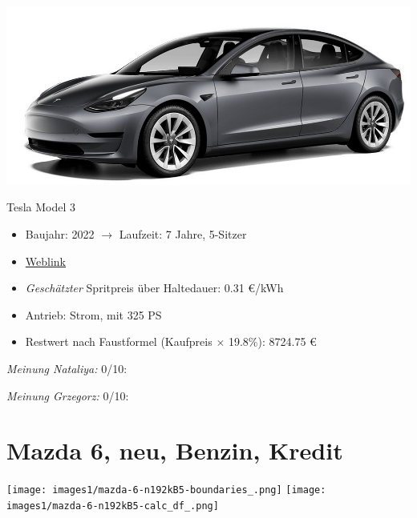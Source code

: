 \documentclass[landscape, DIV=99, 14pt]{scrartcl}
\begin{document}
\pagebreak
\begin{center}
\includegraphics[width=0.9\columnwidth]{cars/tesla-model-3.jpg}

Tesla Model 3
\end{center}

\begin{itemize}
    \item Baujahr: 2022 $\rightarrow$ Laufzeit: 7 Jahre, 5-Sitzer
    \item \href{https://www.tesla.com/de_de/model3/design\#overview}{Weblink}
    \item \emph{Gesch\"atzter} Spritpreis \"uber Haltedauer: 0.31 \euro{}/kWh
    \item Antrieb: Strom, mit 325 PS
    \item Restwert nach Faustformel (Kaufpreis $\times$ 19.8\%): 8724.75 \euro{}
\end{itemize}

\begin{small}
\emph{Meinung Nataliya:} 0/10: 
        
\emph{Meinung Grzegorz:} 0/10: 
\end{small}

\pagebreak


\twocolumn

\section*{Mazda 6, neu, Benzin, Kredit}
\begin{center}
\texttt{[image: images1/mazda-6-n192kB5-boundaries\_.png]}
\null
\vspace{0.5cm}
\texttt{[image: images1/mazda-6-n192kB5-calc\_df\_.png]}
\end{center}
\end{document}
